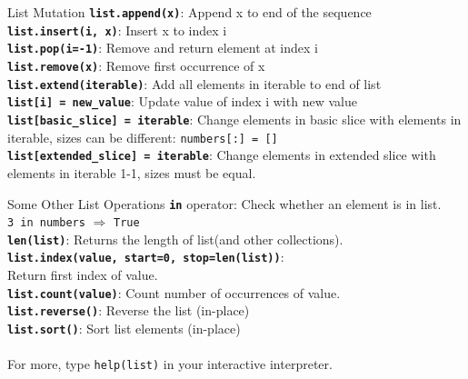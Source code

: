         \begin{frame}{List Mutation}
            \Large
            \textbf{\texttt{list.append(x)}}: Append x to end of the sequence\\
            \textbf{\texttt{list.insert(i, x)}}: Insert x to index i\\
            \textbf{\texttt{list.pop(i=-1)}}: Remove and return element at index i\\
            \textbf{\texttt{list.remove(x)}}: Remove first occurrence of x\\
            \textbf{\texttt{list.extend(iterable)}}: Add all elements in iterable to end of list\\
            \textbf{\texttt{list[i] = new\_value}}: Update value of index i with new value\\
            \textbf{\texttt{list[basic\_slice] = iterable}}: Change elements in basic slice with elements in iterable, sizes can be different: \texttt{numbers[:] = []}\\
            \textbf{\texttt{list[extended\_slice] = iterable}}: Change elements in extended slice with elements in iterable 1-1, sizes must be equal.\\
        \end{frame}

        \begin{frame}{Some Other List Operations}
            \Large
            \textbf{\texttt{in}} operator: Check whether an element is in list.\\
            \texttt{3 in numbers} $\Rightarrow$ \texttt{True}\\
            \textbf{\texttt{len(list)}}: Returns the length of list(and other collections).\\
            \textbf{\texttt{list.index(value, start=0, stop=len(list))}}:\\
            Return first index of value.\\
            \textbf{\texttt{list.count(value)}}: Count number of occurrences of value.\\
            \textbf{\texttt{list.reverse()}}: Reverse the list (in-place)\\
            \textbf{\texttt{list.sort()}}: Sort list elements (in-place)\\
            \\ 
            For more, type \texttt{help(list)} in your interactive interpreter.
        \end{frame}

